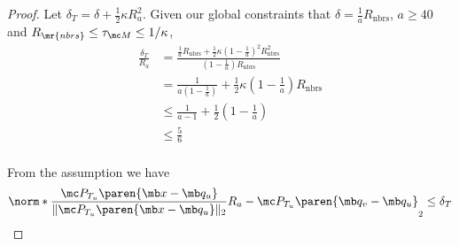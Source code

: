 \begin{proof}
Let $ \delta_T = \delta + \frac{1}{2} \kappa R_a^2$. Given our global constraints that $\delta = \frac{1}{a} R_{\text{nbrs}}$, $a\ge 40$ and $R_{\mr{nbrs}} \le \tau_{\mc M} \le 1/\kappa$,
\begin{equation}\label{eq:bound on delta_T over R_a}
    \begin{aligned}
        \frac{\delta_T}{R_a} 
        &= \frac{\frac{1}{a}R_{\text{nbrs}} + \frac{1}{2}\kappa (1-\frac{1}{a})^2 R_{\text{nbrs}}^2}{(1-\frac{1}{a})R_{\text{nbrs}}}\\
        &=\frac{1}{a(1-\frac{1}{a})} + \frac{1}{2} \kappa (1-\frac{1}{a}) R_{\text{nbrs}}\\
        &\leq \frac{1}{a-1} + \frac{1}{2} (1-\frac{1}{a})\\
        & \le \frac{5}{6} \\ 
    \end{aligned}
\end{equation}

From the assumption we have
 \begin{equation}\label{eq:tangent space covering assumption in tangent term}
     \norm*{ \frac{\mc P_{T_u} \paren{\mb x - \mb q_u}}{\| \mc P_{T_u} \paren{\mb x - \mb q_u}\|_2} R_a - \mc P_{T_u} \paren{\mb q_v - \mb q_u}}_2
     \leq \delta_T
 \end{equation}


\end{proof}
